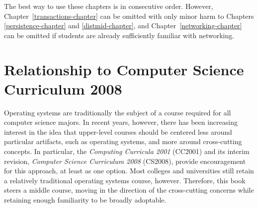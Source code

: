 The best way to use these chapters is in consecutive order.  However,
Chapter~\ref{transactions-chapter} can be omitted with only minor harm
to Chapters \ref{persistence-chapter} and \ref{distmid-chapter}, and
Chapter~\ref{networking-chapter} can be omitted if students are
already sufficiently familiar with networking.

\section*{Relationship to Computer Science Curriculum 2008}

Operating systems are traditionally the subject of a course required
for all computer science majors.  In recent years, however, there has
been increasing interest in the idea that upper-level courses should
be centered less around particular artifacts, such as operating
systems, and more around cross-cutting concepts.  In particular, the
{\em Computing Curricula 2001} (CC2001) and its interim revision,
\textit{Computer Science Curriculum 2008} (CS2008),
provide
encouragement for this approach, at least as one option.  Most
colleges and universities still retain a relatively traditional
operating systems course, however.  Therefore, this book steers a
middle course, moving in the direction of the cross-cutting concerns
while retaining enough familiarity to be broadly adoptable.

